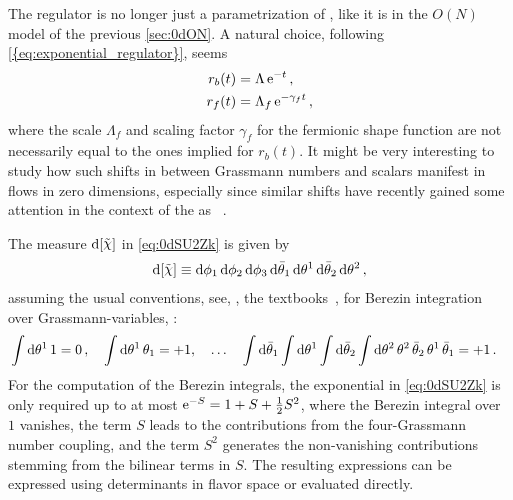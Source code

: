 The regulator is no longer just a parametrization of \rgtime{}, like it is in the $O(N)$ model of the previous \cref{sec:0dON}.
A natural choice, following \cref{{eq:exponential_regulator}},  seems
\begin{subequations}\label{eq:0dSU2rk}
\begin{align}
	r_b( t ) &= \Lambda \, \mathrm{e}^{- t} \, ,\\
	r_f( t ) &= \Lambda_f \, \mathrm{e}^{-\gamma_f t} \, ,
\end{align}
\end{subequations}
where the scale $\Lambda_f$ and scaling factor $\gamma_f$ for the fermionic shape function are not necessarily equal to the ones implied for $r_b(t)$.
It might be very interesting to study how such shifts in \rgscales{} between Grassmann numbers and scalars manifest in \frg{} flows in zero dimensions, especially since similar shifts have recently gained some attention in the context of the \qmm{} as \loeft{}~\cite{Ihssen:2023xlp}.

The measure $\dif\,[\FSff{\FSsf}]$ in \cref{eq:0dSU2Zk} is given by
\begin{align}
 \dif\,[\FSff{\FSsf}] \equiv \dif\phi_1\dif\phi_2\dif\phi_3 \dif\bar{\Ftheta}_1\dif\Ftheta^1\dif\bar{\Ftheta}_2\dif\Ftheta^2\, ,
\end{align}
assuming the usual conventions, see, \eg{}, the textbooks~\cite{Berezin1966,Greiner:1996zu,Peskin:1995ev}, for Berezin integration~\cite{Berezin1966} over Grassmann-variables, \eg{}:
\begin{align}
	&	\int \dif\theta^1 \, 1 = 0 \, ,\quad	\int \dif\theta^1 \, \theta_1 = +1,\quad\ldots\quad \int \dif\bar{\theta}_1\int\dif\theta^1 \int\dif \bar{\theta}_2\int \dif\theta^2  \, \theta^2 \, \bar{\theta}_2 \,\theta^1   \, \bar{\theta}_1 = +1\,.\label{eq:0dSU2Berenzin1}
\end{align}
For the computation of the Berezin integrals, the exponential in \cref{eq:0dSU2Zk} is only required up to at most $\mathrm{e}^{-S}=1+S+\tfrac{1}{2}S^2$, where the Berezin integral over $1$ vanishes, the term $S$ leads to the contributions from the four-Grassmann number coupling, and the term $S^2$ generates the non-vanishing contributions stemming from the bilinear terms in $S$.
The resulting expressions can be expressed using determinants in flavor space or evaluated directly.

